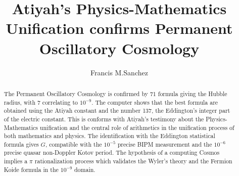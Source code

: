 \documentclass[preprint,12pt]{elsarticle}
\begin{document}
\begin{frontmatter}




\title{Atiyah's Physics-Mathematics Unification confirms Permanent Oscillatory Cosmology} %



\author[mysecondaryaddress]{Francis M.Sanchez}

\address[mymainaddress]{1600 John F Kennedy Boulevard, Philadelphia}
\address[mysecondaryaddress]{360 Park Avenue South, New York}

\begin{abstract}
The Permanent Oscillatory Cosmology is confirmed by 71 formula giving the Hubble radius, with 7 correlating to $10^{-9}$. The computer shows that the best formula are obtained using the Atiyah constant and the number 137, the Eddington's integer part of the electric constant. This is conforms with Atiyah's testimony about the Physics-Mathematics unification and the central role of arithmetics in the unification process of both mathematics and physics. The identification with the Eddington statistical formula gives $G$, compatible with the $10^{-5}$ precise BIPM measurement and the $10^{-6}$ precise quasar non-Doppler Kotov period. The hypothesis of a computing Cosmos implies a $\pi$ rationalization process which validates the Wyler's theory and the Fermion Koide formula in the $10^{-9}$ domain. 
\end{abstract}


\end{frontmatter}
\end{document}
